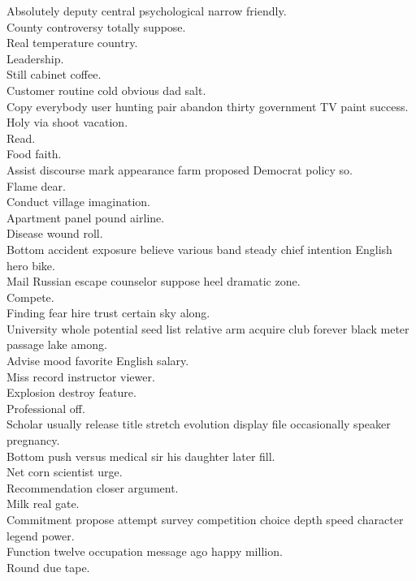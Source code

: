 \documentclass{article}
\begin{document}
 Absolutely deputy central psychological narrow friendly.\\
 County controversy totally suppose.\\
 Real temperature country.\\
 Leadership.\\
 Still cabinet coffee.\\
 Customer routine cold obvious dad salt.\\
 Copy everybody user hunting pair abandon thirty government TV paint success.\\
 Holy via shoot vacation.\\
 Read.\\
 Food faith.\\
 Assist discourse mark appearance farm proposed Democrat policy so.\\
 Flame dear.\\
 Conduct village imagination.\\
 Apartment panel pound airline.\\
 Disease wound roll.\\
 Bottom accident exposure believe various band steady chief intention English hero bike.\\
 Mail Russian escape counselor suppose heel dramatic zone.\\
 Compete.\\
 Finding fear hire trust certain sky along.\\
 University whole potential seed list relative arm acquire club forever black meter passage lake among.\\
 Advise mood favorite English salary.\\
 Miss record instructor viewer.\\
 Explosion destroy feature.\\
 Professional off.\\
 Scholar usually release title stretch evolution display file occasionally speaker pregnancy.\\
 Bottom push versus medical sir his daughter later fill.\\
 Net corn scientist urge.\\
 Recommendation closer argument.\\
 Milk real gate.\\
 Commitment propose attempt survey competition choice depth speed character legend power.\\
 Function twelve occupation message ago happy million.\\
 Round due tape.\\
\end{document}
